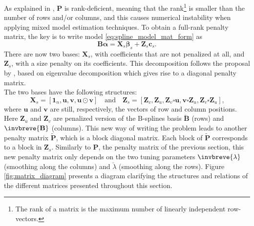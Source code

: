As explained in \textcite{rodriguez-alvarez_spatial_2016}, $\mathbf{P}$ is rank-deficient, meaning that the rank\footnote{The rank of a matrix is the maximum number of linearly independent row-vectors.} is smaller than the 
number of rows and/or columns, and this causes numerical instability when applying mixed model estimation techniques. To obtain 
a full-rank penalty matrix, the key is to write model \ref{eq:spline_model_mat_form} as 
\begin{equation}
    \mathbf{B}\boldsymbol{\alpha} = \boldsymbol{X}_{s} \boldsymbol{\beta}_{s}+\boldsymbol{Z}_{s} \boldsymbol{c}_{s}
    \text{.}
\end{equation}
There are now two bases: $\mathbf{X}_{s}$, with coefficients that are not penalized at all, and $\mathbf{Z}_{s}$, with a size 
penalty on its coefficients. This decomposition follows the proposal by \textcite{lee_p-spline_2011}, based on eigenvalue 
decomposition which gives rise to a diagonal penalty matrix.\\
The two bases have the following structures:
\begin{equation}
    \boldsymbol{X}_{s}=\left[\mathbf{1}_{n}, \boldsymbol{u}, \boldsymbol{v}, \boldsymbol{u} \odot \boldsymbol{v}\right]
    \quad
    \text{and}
    \quad
    \mathbf{Z}_{s}=\left[\mathbf{Z}_{v}, \mathbf{Z}_{u}, \mathbf{Z}_{v} \square \mathbf{u}, \mathbf{v} \square \mathbf{Z}_{u}, 
    \mathbf{Z}_{v} \square \mathbf{Z}_{u}\right]
    \text{,}
    \label{eq:detail_Xs_Zs_matrices}
\end{equation}
where $\boldsymbol{u}$ and $\boldsymbol{v}$ are still, respectively, the vectors of row and column positions. 
Here $\mathbf{Z}_{u}$ and $\mathbf{Z}_{v}$ are penalized version of the B-splines basis $\breve{\mathbf{B}}$ (rows) and
$\invbreve{\mathbf{B}}$ (columns). This new way of writing the problem leads to another penalty matrix 
$ \widetilde{\boldsymbol{P}}$, which is a block diagonal matrix. Each block of $ \widetilde{\boldsymbol{P}}$ corresponds to a 
block in $\mathbf{Z}_{s}$. Similarly to $\boldsymbol{P}$, the penalty matrix of the previous section, this new penalty matrix 
only depends on the two tuning parameters $\invbreve{\lambda}$ (smoothing along the columns) and $\breve{\lambda}$ (smoothing 
along the rows).
Figure \ref{fig:matrix_diagram} presents a diagram clarifying the structures and relations of the different matrices presented 
throughout this section.


